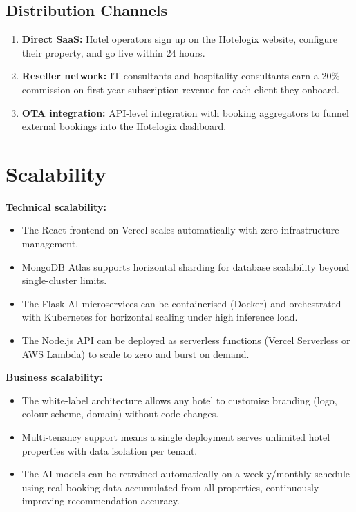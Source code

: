 \documentclass[12pt,a4paper]{report}
\begin{document}
\subsection*{Distribution Channels}
\begin{enumerate}[leftmargin=*, label=\arabic*.]
  \item \textbf{Direct SaaS:} Hotel operators sign up on the Hotelogix website, configure their property, and go live within 24 hours.
  \item \textbf{Reseller network:} IT consultants and hospitality consultants earn a 20\% commission on first-year subscription revenue for each client they onboard.
  \item \textbf{OTA integration:} API-level integration with booking aggregators to funnel external bookings into the Hotelogix dashboard.
\end{enumerate}

\section{Scalability}

\textbf{Technical scalability:}
\begin{itemize}[leftmargin=*, label=\textbullet]
  \item The React frontend on Vercel scales automatically with zero infrastructure management.
  \item MongoDB Atlas supports horizontal sharding for database scalability beyond single-cluster limits.
  \item The Flask AI microservices can be containerised (Docker) and orchestrated with Kubernetes for horizontal scaling under high inference load.
  \item The Node.js API can be deployed as serverless functions (Vercel Serverless or AWS Lambda) to scale to zero and burst on demand.
\end{itemize}

\textbf{Business scalability:}
\begin{itemize}[leftmargin=*, label=\textbullet]
  \item The white-label architecture allows any hotel to customise branding (logo, colour scheme, domain) without code changes.
  \item Multi-tenancy support means a single deployment serves unlimited hotel properties with data isolation per tenant.
  \item The AI models can be retrained automatically on a weekly/monthly schedule using real booking data accumulated from all properties, continuously improving recommendation accuracy.
\end{itemize}
\end{document}

